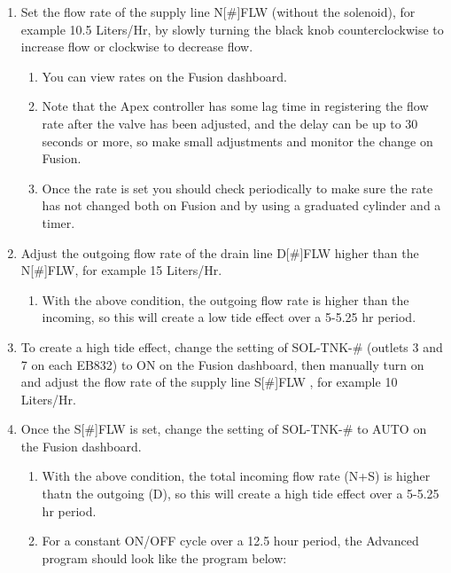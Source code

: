 \documentclass[]{book}
\providecommand{\tightlist}{%
  \setlength{\itemsep}{0pt}\setlength{\parskip}{0pt}}
\begin{document}
\begin{enumerate}
\def\labelenumi{\arabic{enumi}.}
\tightlist
\item
  Set the flow rate of the supply line N{[}\#{]}FLW (without the
  solenoid), for example 10.5 Liters/Hr, by slowly turning the black
  knob counterclockwise to increase flow or clockwise to decrease flow.

  \begin{enumerate}
  \def\labelenumii{\arabic{enumii}.}
  \tightlist
  \item
    You can view rates on the Fusion dashboard.
  \item
    Note that the Apex controller has some lag time in registering the
    flow rate after the valve has been adjusted, and the delay can be up
    to 30 seconds or more, so make small adjustments and monitor the
    change on Fusion.
  \item
    Once the rate is set you should check periodically to make sure the
    rate has not changed both on Fusion and by using a graduated
    cylinder and a timer.
  \end{enumerate}
\item
  Adjust the outgoing flow rate of the drain line D{[}\#{]}FLW higher
  than the N{[}\#{]}FLW, for example 15 Liters/Hr.

  \begin{enumerate}
  \def\labelenumii{\arabic{enumii}.}
  \tightlist
  \item
    With the above condition, the outgoing flow rate is higher than the
    incoming, so this will create a low tide effect over a 5-5.25 hr
    period.
  \end{enumerate}
\item
  To create a high tide effect, change the setting of SOL-TNK-\#
  (outlets 3 and 7 on each EB832) to ON on the Fusion dashboard, then
  manually turn on and adjust the flow rate of the supply line
  S{[}\#{]}FLW , for example 10 Liters/Hr.\\
\item
  Once the S{[}\#{]}FLW is set, change the setting of SOL-TNK-\# to AUTO
  on the Fusion dashboard.

  \begin{enumerate}
  \def\labelenumii{\arabic{enumii}.}
  \tightlist
  \item
    With the above condition, the total incoming flow rate (N+S) is
    higher thatn the outgoing (D), so this will create a high tide
    effect over a 5-5.25 hr period.
  \item
    For a constant ON/OFF cycle over a 12.5 hour period, the Advanced
    program should look like the program below:
  \end{enumerate}
\end{enumerate}
\end{document}
